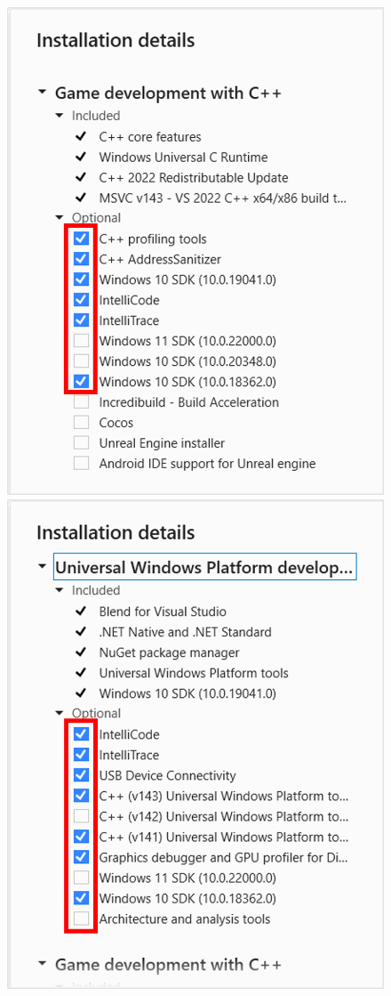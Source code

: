 {\begin{spacing}{1.5}
\begin{figure}[H]
            \includegraphics[scale=0.7]{Images/3/3.Intro.3.3} \hspace{5mm}
            \includegraphics[scale=0.7]{Images/3/3.Intro.3.4}

\end{figure}
\end{spacing}}
